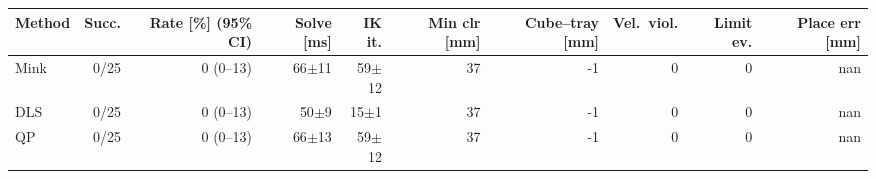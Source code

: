 \begin{tabular}{lrrrrrrrrr}
\toprule
Method & Succ. & Rate [\%] (95\% CI) & Solve [ms] & IK it. & Min clr [mm] & Cube--tray [mm] & Vel.\ viol. & Limit ev. & Place err [mm]\\
\midrule
Mink & 0/25 & 0 (0--13) & 66$\pm$11 & 59$\pm$12 & 37 & -1 & 0 & 0 & nan\\
DLS & 0/25 & 0 (0--13) & 50$\pm$9 & 15$\pm$1 & 37 & -1 & 0 & 0 & nan\\
QP & 0/25 & 0 (0--13) & 66$\pm$13 & 59$\pm$12 & 37 & -1 & 0 & 0 & nan\\
\bottomrule
\end{tabular}
